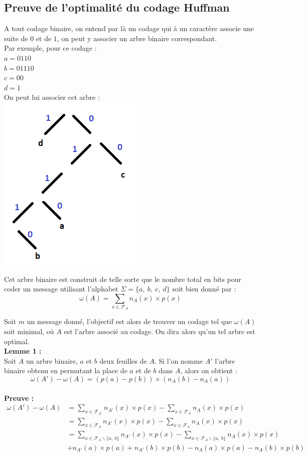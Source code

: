 \documentclass[a4paper, 12pt]{article}
\begin{document}
\subsection{Preuve de l'optimalité du codage Huffman}
A tout codage binaire, on entend par là un codage qui à un caractère associe une suite de $0$ et de $1$, on peut y associer un arbre binaire correspondant. \\
Par exemple, pour ce codage : \\
$a = 0110$ \\
$b = 01110$ \\
$c = 00$ \\
$d = 1$ \\
On peut lui associer cet arbre : \\
\includegraphics[width=0.3\linewidth]{tree.png}
 
Cet arbre binaire est construit de telle sorte que le nombre total en bits pour coder un message utilisant l'alphabet $\Sigma = \{a,\ b,\ c,\ d\}$ soit bien donné par : \\
$$
\omega(A) = \sum_{x\in \mathcal{F}_A} n_A(x)\times p(x)‎‎
$$

Soit $m$ un message donné, l'objectif est alors de trouver un codage tel que $\omega(A)$ soit minimal, où $A$ est l'arbre associé au codage. On dira alors qu'un tel arbre est optimal. \\

\textbf{Lemme 1 :} \\
Soit $A$ un arbre binaire, $a$ et $b$ deux feuilles de $A$. Si l'on nomme $A'$ l'arbre binaire obtenu en permutant la place de $a$ et de $b$ dans $A$, alors on obtient :
$$
\omega(A')-\omega(A) = (p(a) - p(b))\times(n_A(b) - n_A(a))
$$
\\

\textbf{Preuve :} \\
\begin{align*}
\omega(A')-\omega(A) &= \sum_{x\in \mathcal{F}_{A'}} n_{A'}(x)\times p(x)‎‎-\sum_{x\in \mathcal{F}_A} n_A(x)\times p(x)‎‎ \\
&= \sum_{x\in \mathcal{F}_A} n_{A'}(x)\times p(x)‎‎-\sum_{x\in \mathcal{F}_A} n_A(x)\times p(x)‎‎ \\
&= \sum_{x\in \mathcal{F}_A\backslash\{a,\ b\}} n_{A'}(x)\times p(x)‎‎-\sum_{x\in \mathcal{F}_A\backslash\{a,\ b\}} n_A(x)\times p(x)‎‎ \\
&+ n_{A'}(a)\times p(a) + n_{A'}(b)\times p(b) - n_A(a)\times p(a) - n_A(b)\times p(b)
\end{align*}
\end{document}

